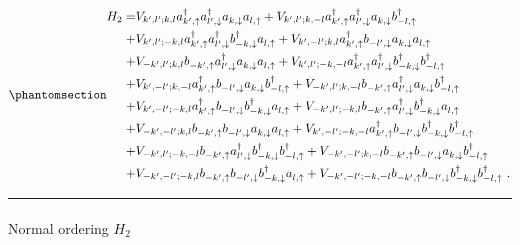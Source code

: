 \documentclass[
  letterpaper,
  DIV=11,
  numbers=noendperiod]{scrartcl}
\makeatletter
\let\oldparagraph\paragraph
\renewcommand{\paragraph}{
    \@ifstar
      \xxxParagraphStar
      \xxxParagraphNoStar
  }
\newcommand{\xxxParagraphStar}[1]{\oldparagraph*{#1}\mbox{}}
\newcommand{\xxxParagraphNoStar}[1]{\oldparagraph{#1}\mbox{}}
\makeatother
\begin{document}
\begin{equation}\protect\phantomsection\label{eq-H2_1}{
\begin{align}
H_2= &V_{k',l';k,l}a^\dagger_{k',\uparrow}a^\dagger_{l',\downarrow}a^{}_{k,\downarrow}a^{}_{l,\uparrow}+V_{k',l';k,-l}a^\dagger_{k',\uparrow}a^\dagger_{l',\downarrow}a^{}_{k,\downarrow}b^\dagger_{-l,\uparrow}\\
+&V_{k',l';-k,l}a^\dagger_{k',\uparrow}a^\dagger_{l',\downarrow}b^\dagger_{-k,\downarrow}a^{}_{l,\uparrow}+V_{k',-l';k,l}a^\dagger_{k',\uparrow}b^{}_{-l',\downarrow}a^{}_{k,\downarrow}a^{}_{l,\uparrow}\\
+&V_{-k',l';k,l}b^{}_{-k',\uparrow}a^\dagger_{l',\downarrow}a^{}_{k,\downarrow}a^{}_{l,\uparrow}+V_{k',l';-k,-l}a^\dagger_{k',\uparrow}a^\dagger_{l',\downarrow}b^\dagger_{-k,\downarrow}b^\dagger_{-l,\uparrow}\\
+&V_{k',-l';k,-l}a^\dagger_{k',\uparrow}b^{}_{-l',\downarrow}a^{}_{k,\downarrow}b^\dagger_{-l,\uparrow}+V_{-k',l';k,-l}b^{}_{-k',\uparrow}a^\dagger_{l',\downarrow}a^{}_{k,\downarrow}b^\dagger_{-l,\uparrow}\\
%
+&V_{k',-l';-k,l}a^\dagger_{k',\uparrow}b^{}_{-l',\downarrow}b^\dagger_{-k,\downarrow}a^{}_{l,\uparrow}+V_{-k',l';-k,l}b^{}_{-k',\uparrow}a^\dagger_{l',\downarrow}b^\dagger_{-k,\downarrow}a^{}_{l,\uparrow}\\
+&V_{-k',-l';k,l}b^{}_{-k',\uparrow}b^{}_{-l',\downarrow}a^{}_{k,\downarrow}a^{}_{l,\uparrow}+V_{k',-l';-k,-l}a^\dagger_{k',\uparrow}b^{}_{-l',\downarrow}b^\dagger_{-k,\downarrow}b^\dagger_{-l,\uparrow}\\
+&V_{-k',l';-k,-l}b^{}_{-k',\uparrow}a^\dagger_{l',\downarrow}b^\dagger_{-k,\downarrow}b^\dagger_{-l,\uparrow}+V_{-k',-l';k,-l}b^{}_{-k',\uparrow}b^{}_{-l',\downarrow}a^{}_{k,\downarrow}b^\dagger_{-l,\uparrow}\\
+&V_{-k',-l';-k,l}b^{}_{-k',\uparrow}b^{}_{-l',\downarrow}b^\dagger_{-k,\downarrow}a^{}_{l,\uparrow}+V_{-k',-l';-k,-l}b^{}_{-k',\uparrow}b^{}_{-l',\downarrow}b^\dagger_{-k,\downarrow}b^\dagger_{-l,\uparrow}\ .
\end{align}
}\end{equation}

\begin{center}\rule{0.5\linewidth}{0.5pt}\end{center}

\paragraph{\texorpdfstring{Normal ordering
\(H_2\)}{Normal ordering H\_2}}\label{normal-ordering-h_2}
\end{document}
